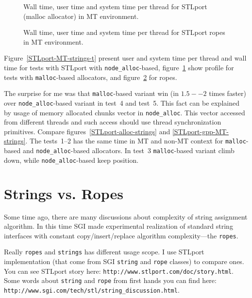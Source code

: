 \documentclass[a4paper]{article}
\providecommand{\STLport}{{\fontfamily{cmss}\selectfont STLport}}
\begin{document}
\begin{figure}
  \begin{center}
    
  \end{center}
  \caption{
           Wall time, user time and system time per thread for 
           \STLport{} (malloc allocator) in MT environment.
           \label{STLport-MT-strings-m}}
\end{figure}

\begin{figure}
  \begin{center}
    
  \end{center}
  \caption{
           Wall time, user time and system time per thread for 
           \STLport{} ropes in MT environment.
           \label{STLport-MT-strings-r}}
\end{figure}

Figure~\ref{STLport-MT-strings-t} present user and system time per thread
and wall time for tests with STLport with
\texttt{node\_alloc}-based,
figure~\ref{STLport-MT-strings-m} show profile for tests with \texttt{malloc}-based allocators, and figure~\ref{STLport-MT-strings-r} for ropes.

The surprise for me was that \texttt{malloc}-based variant
win (in $1.5--2$ times faster) over \texttt{node\_alloc}-based variant in test~4
and test~5.
This fact can be explained by usage of memory allocated chunks vector
in \texttt{node\_alloc}. This vector accessed from different threads
and such access should use thread synchronization primitives.
Compare figures~\ref{STLport-alloc-strings} and \ref{STLport-gpp-MT-strings}.
The tests~1--2 has the same time in MT and non-MT context for
\texttt{malloc}-based and \texttt{node\_alloc}-based allocators.
In test~3 \texttt{malloc}-based variant climb down, while
\texttt{node\_alloc}-based keep position. 

\section{Strings vs. Ropes}

Some time ago, there are many discussions about complexity
of string assignment algorithm.
In this time 
SGI made experimental realization of standard string interfaces
with constant copy/insert/replace algorithm complexity---the \texttt{ropes}.

Really \texttt{ropes} and \texttt{strings} has different usage scope.
I use STLport implementation (that come from SGI \texttt{string} and \texttt{rope}
classes) to compare ones. You can see STLport story here:
\texttt{http://www.stlport.com/doc/story.html}.
Some words about \texttt{string} and \texttt{rope}
from first hands you can find here:\\
\texttt{http://www.sgi.com/tech/stl/string\_discussion.html}.
\end{document}
